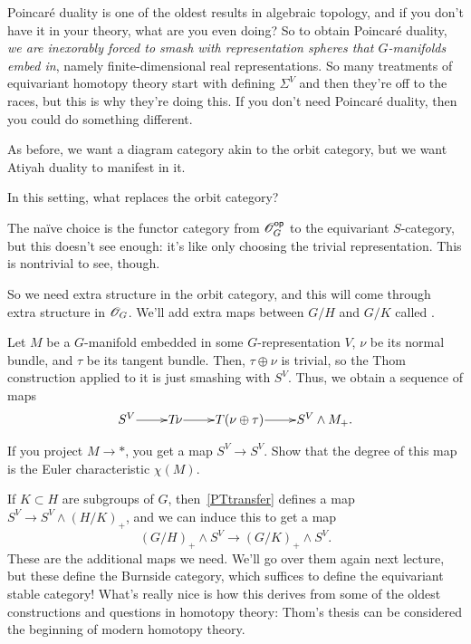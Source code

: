 Poincaré duality is one of the oldest results in algebraic topology, and if you don't have it in your theory, what
are you even doing? So to obtain Poincaré duality, \emph{we are inexorably forced to smash with representation
spheres that $G$-manifolds embed in}, namely finite-dimensional real representations. So many treatments of
equivariant homotopy theory start with defining $\Sigma^V$ and then they're off to the races, but this is why
they're doing this. If you don't need Poincaré duality, then you could do something different.

As before, we want a diagram category akin to the orbit category, but we want Atiyah duality to manifest in it.
\begin{ques}
In this setting, what replaces the orbit category?
\end{ques}
The naïve choice is the functor category from $\mathscr O_G^{\mathsf{op}}$ to the equivariant $S$-category, but this doesn't see
enough: it's like only choosing the trivial representation. This is nontrivial to see, though.

So we need extra structure in the orbit category, and this will come through extra structure in $\mathscr O_G$. We'll add
extra maps between $G/H$ and $G/K$ called .

Let $M$ be a $G$-manifold embedded in some $G$-representation $V$, $\nu$ be its normal bundle, and $\tau$ be its
tangent bundle. Then, $\tau\oplus\nu$ is trivial, so the Thom construction applied to it is just smashing with
$S^V$. Thus, we obtain a sequence of maps
\begin{equation}
\label{PTtransfer}
\xymatrix@1{
	S^V\ar[r] & T\!\nu\ar[r] & T(\nu\oplus\tau)\ar[r] & S^V\wedge M_+.
}
\end{equation}
\begin{ex}
If you project $M\to *$, you get a map $S^V\to S^V$. Show that the degree of this map is the Euler characteristic
$\chi(M)$.
\end{ex}
If $K\subset H$ are subgroups of $G$, then~\eqref{PTtransfer} defines a map $S^V\to S^V\wedge (H/K)_+$, and we can
induce this to get a map
\[(G/H)_+\wedge S^V\longrightarrow (G/K)_+\wedge S^V.\]
These are the additional maps we need. We'll go over them again next lecture, but these define the Burnside
category, which suffices to define the equivariant stable category! What's really nice is how this derives from
some of the oldest constructions and questions in homotopy theory: Thom's thesis can be considered the beginning of
modern homotopy theory.

